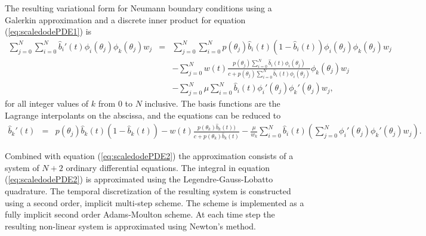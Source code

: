 \documentclass[12pt]{article}
\begin{document}
The resulting variational form for Neumann boundary conditions using a
Galerkin approximation and a discrete inner product for equation
(\ref{eq:scaledodePDE1}) is
\begin{eqnarray}
  \sum_{j=0}^N \sum_{i=0}^N  \hat{b}_i'(t) \phi_i(\theta_j) \phi_k(\theta_j) w_j
  & = &
  \sum_{j=0}^N \sum_{i=0}^N p(\theta_j)  \hat{b}_i(t) (1 - \hat{b}_i(t) ) \phi_i(\theta_j) \phi_k(\theta_j) w_j \\
  & &  -  \sum_{j=0}^N w(t) \frac{p(\theta_j) \sum_{i=0}^N \hat{b}_i(t) \phi_i(\theta_j) }{c+p(\theta_j) \sum_{i=0}^N \hat{b}_i(t) \phi_i(\theta_j)} \phi_k(\theta_j) w_j \nonumber \\ 
  & & - \sum_{j=0}^N \mu  \sum_{i=0}^N \hat{b}_i(t) \phi_i'(\theta_j) \phi_k'(\theta_j)  w_j, \nonumber
\end{eqnarray}
for all integer values of $k$ from $0$ to $N$ inclusive.  The basis
functions are the Lagrange interpolants on the abscissa, and the
equations can be reduced to
\begin{eqnarray}
  \hat{b}_k'(t) 
  & = &
        p(\theta_j) \hat{b}_k(t) (1 - \hat{b}_k(t) )
        -  w(t) \frac{p(\theta_k) \hat{b}_k(t)) }{c+p(\theta_k)  \hat{b}_k(t) }  
   - \frac{\mu}{w_k} \sum_{i=0}^N \hat{b}_i(t) \left( \sum_{j=0}^N  \phi_i'(\theta_j) \phi_k'(\theta_j)  w_j \right).
\end{eqnarray}

Combined with equation (\ref{eq:scaledodePDE2}) the approximation
consists of a system of $N+2$ ordinary differential equations. The
integral in equation (\ref{eq:scaledodePDE2}) is approximated using
the Legendre-Gauss-Lobatto quadrature. The temporal discretization of
the resulting system is constructed using a second order, implicit
multi-step scheme. The scheme is implemented as a fully implicit
second order Adams-Moulton scheme\cite{ascher2011first}. At each time
step the resulting non-linear system is approximated using Newton's
method.


\clearpage


\end{document}
